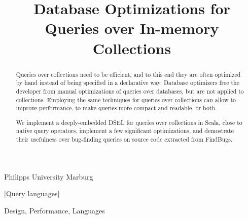 \documentclass[preprint,authoryear,10pt]{sigplanconf}
\begin{document}
\copyrightdata{[to be supplied]} 


\title{Database Optimizations for Queries over In-memory Collections}

	   {Philipps University Marburg}



\maketitle

\begin{abstract}
Queries over collections need to be efficient, and to this end they are often optimized by hand instead of
being specified in a declarative way. Database optimizers free the developer from manual optimizations of queries
over databases, but are not applied to collections. Employing the same techniques for queries over collections can
allow to improve performance, to make queries more compact and readable, or both.

We implement a deeply-embedded DSEL for queries over collections in Scala, close to native query operators,
implement a few significant optimizations, and demostrate their usefulness over bug-finding queries on source code
extracted from FindBugs.
\end{abstract}

[Query languages]

\terms
Design, Performance, Languages
\end{document}
